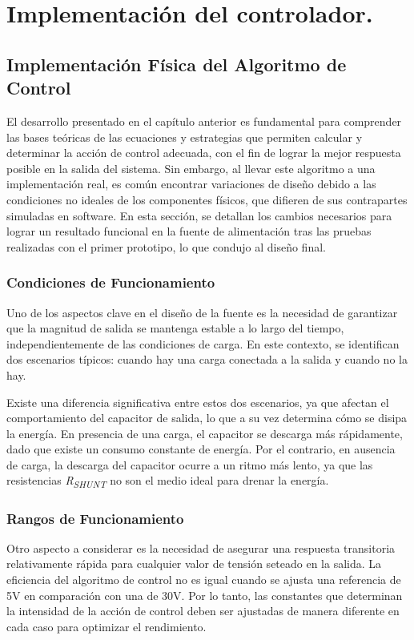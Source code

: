 \chapter{Implementación del controlador.}

\label{C:Implementación del algoritmo de control}
\section{Implementación Física del Algoritmo de Control}
El desarrollo presentado en el capítulo anterior es fundamental para comprender las bases teóricas de las ecuaciones y estrategias que permiten calcular y determinar la acción de control adecuada, con el fin de lograr la mejor respuesta posible en la salida del sistema. Sin embargo, al llevar este algoritmo a una implementación real, es común encontrar variaciones de diseño debido a las condiciones no ideales de los componentes físicos, que difieren de sus contrapartes simuladas en software. En esta sección, se detallan los cambios necesarios para lograr un resultado funcional en la fuente de alimentación tras las pruebas realizadas con el primer prototipo, lo que condujo al diseño final.\par

\subsection{Condiciones de Funcionamiento}
Uno de los aspectos clave en el diseño de la fuente es la necesidad de garantizar que la magnitud de salida se mantenga estable a lo largo del tiempo, independientemente de las condiciones de carga. En este contexto, se identifican dos escenarios típicos: cuando hay una carga conectada a la salida y cuando no la hay. \par
Existe una diferencia significativa entre estos dos escenarios, ya que afectan el comportamiento del capacitor de salida, lo que a su vez determina cómo se disipa la energía. En presencia de una carga, el capacitor se descarga más rápidamente, dado que existe un consumo constante de energía. Por el contrario, en ausencia de carga, la descarga del capacitor ocurre a un ritmo más lento, ya que las resistencias \textit{R\textsubscript{SHUNT}} no son el medio ideal para drenar la energía. \par

\subsection{Rangos de Funcionamiento}
Otro aspecto a considerar es la necesidad de asegurar una respuesta transitoria relativamente rápida para cualquier valor de tensión seteado en la salida. La eficiencia del algoritmo de control no es igual cuando se ajusta una referencia de 5V en comparación con una de 30V. Por lo tanto, las constantes que determinan la intensidad de la acción de control deben ser ajustadas de manera diferente en cada caso para optimizar el rendimiento.\par

